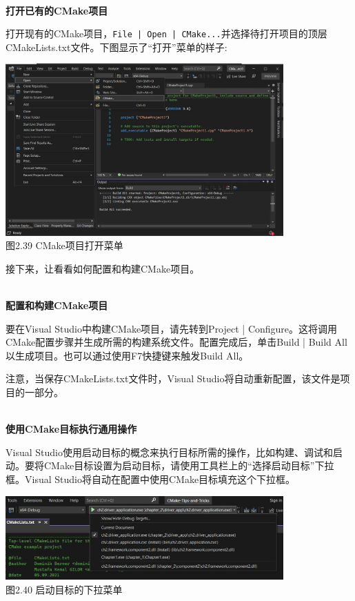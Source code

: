 \hspace*{\fill} \\ %
\noindent
\textbf{打开已有的CMake项目}

打开现有的CMake项目，\texttt{File | Open | CMake...}并选择待打开项目的顶层CMakeLists.txt文件。下图显示了“打开”菜单的样子:

\begin{center}
\includegraphics[width=0.8\textwidth]{content/1/chapter2/images/39.jpg}\\
图2.39 CMake项目打开菜单
\end{center}

接下来，让看看如何配置和构建CMake项目。

\hspace*{\fill} \\ %
\noindent
\textbf{配置和构建CMake项目}

要在Visual Studio中构建CMake项目，请先转到Project | Configure。这将调用CMake配置步骤并生成所需的构建系统文件。配置完成后，单击Build | Build All以生成项目。也可以通过使用F7快捷键来触发Build All。

注意，当保存CMakeLists.txt文件时，Visual Studio将自动重新配置，该文件是项目的一部分。

\hspace*{\fill} \\ %
\noindent
\textbf{使用CMake目标执行通用操作}

Visual Studio使用启动目标的概念来执行目标所需的操作，比如构建、调试和启动。要将CMake目标设置为启动目标，请使用工具栏上的“选择启动目标”下拉框。Visual Studio将自动在配置中使用CMake目标填充这个下拉框。

\begin{center}
\includegraphics[width=0.8\textwidth]{content/1/chapter2/images/40.jpg}\\
图2.40 启动目标的下拉菜单
\end{center}

